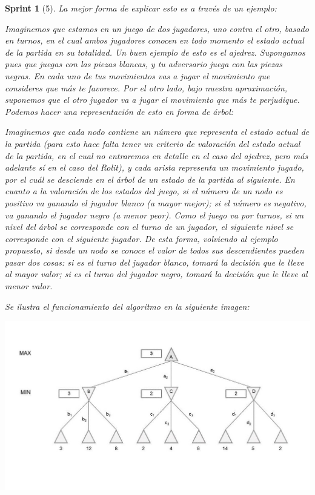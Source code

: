 \documentclass{article}
\theoremstyle{break}
\newtheorem*{sprint}{Sprint}
\begin{document}
\begin{sprint}[5]
La mejor forma de explicar esto es a través de un ejemplo:

Imaginemos que estamos en un juego de dos jugadores, uno contra el otro, basado en turnos, en el cual ambos jugadores conocen en todo momento el estado actual de la partida en su totalidad. Un buen ejemplo de esto es el ajedrez. Supongamos pues que juegas con las piezas blancas, y tu adversario juega con las piezas negras. En cada uno de tus movimientos vas a jugar el movimiento que consideres que más te favorece. Por el otro lado, bajo nuestra aproximación, suponemos que el otro jugador va a jugar el movimiento que más te perjudique. Podemos hacer una representación de esto en forma de árbol:

Imaginemos que cada nodo contiene un número que representa el estado actual de la partida (para esto hace falta tener un criterio de valoración del estado actual de la partida, en el cual no entraremos en detalle en el caso del ajedrez, pero más adelante sí en el caso del Rolit), y cada arista representa un movimiento jugado, por el cuál se desciende en el árbol de un estado de la partida al siguiente. En cuanto a la valoración de los estados del juego, si el número de un nodo es positivo va ganando el jugador blanco (a mayor mejor); si el número es negativo, va ganando el jugador negro (a menor peor). Como el juego va por turnos, si un nivel del árbol se corresponde con el turno de un jugador, el siguiente nivel se corresponde con el siguiente jugador. De esta forma, volviendo al ejemplo propuesto, si desde un nodo se conoce el valor de todos sus descendientes pueden pasar dos cosas: si es el turno del jugador blanco, tomará la decisión que le lleve al mayor valor; si es el turno del jugador negro, tomará la decisión que le lleve al menor valor. 

Se ilustra el funcionamiento del algoritmo en la siguiente imagen: 

\begin{center}
\centering
\includegraphics[scale=0.5]{minimaxExample.jpg}
\end{center}


\end{sprint}
\end{document}
